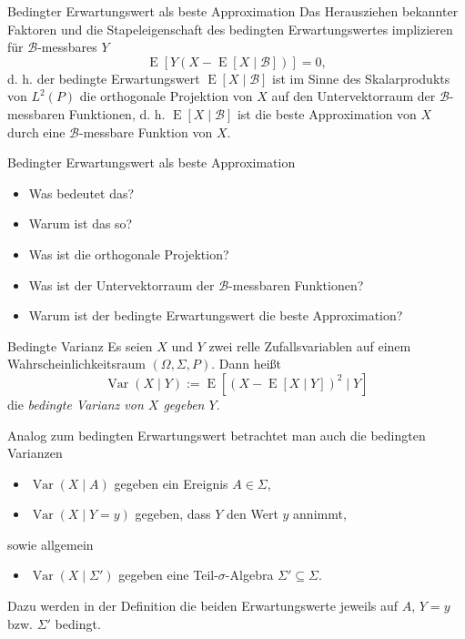 \begin{theo}{Bedingter Erwartungswert als beste Approximation}
    Das Herausziehen bekannter Faktoren und die Stapeleigenschaft des bedingten Erwartungswertes implizieren für $\mathcal{B}$-messbares $Y$
    \[
        \operatorname{E} [Y(X - \operatorname{E} [X \mid \mathcal{B}])] = 0,
    \]
    d. h. der bedingte Erwartungswert $\operatorname{E} [X \mid \mathcal{B}]$ ist im Sinne des Skalarprodukts von $L^2(P)$ die orthogonale Projektion von $X$ auf den Untervektorraum der $\mathcal{B}$-messbaren Funktionen, d. h. $\operatorname{E} [X \mid \mathcal{B}]$ ist die beste Approximation von $X$ durch eine $\mathcal{B}$-messbare Funktion von $X$.
\end{theo}

\begin{info}{Bedingter Erwartungswert als beste Approximation}
    \begin{itemize}
        \item Was bedeutet das?
        \item Warum ist das so?
        \item Was ist die orthogonale Projektion?
        \item Was ist der Untervektorraum der $\mathcal{B}$-messbaren Funktionen?
        \item Warum ist der bedingte Erwartungswert die beste Approximation?
    \end{itemize}

\end{info}

\begin{defi}{Bedingte Varianz}
    Es seien $X$ und $Y$ zwei relle Zufallsvariablen auf einem Wahrscheinlichkeitsraum $(\Omega, \Sigma, P)$.
    Dann heißt
    \[
        \operatorname{Var}(X \mid Y) := \operatorname{E}[(X - \operatorname{E}[X \mid Y])^2 \mid Y]
    \]
    die \emph{bedingte Varianz von $X$ gegeben $Y$}.

    Analog zum bedingten Erwartungswert betrachtet man auch die bedingten Varianzen
    \begin{itemize}
        \item $\operatorname{Var}(X \mid A)$ gegeben ein Ereignis $A \in \Sigma$,
        \item $\operatorname{Var}(X \mid Y = y)$ gegeben, dass $Y$ den Wert $y$ annimmt,
    \end{itemize}
    sowie allgemein
    \begin{itemize}
        \item $\operatorname{Var}(X \mid \Sigma')$ gegeben eine Teil-$\sigma$-Algebra $\Sigma' \subseteq \Sigma$.
    \end{itemize}

    Dazu werden in der Definition die beiden Erwartungswerte jeweils auf $A$, $Y = y$ bzw. $\Sigma'$ bedingt.
\end{defi}

